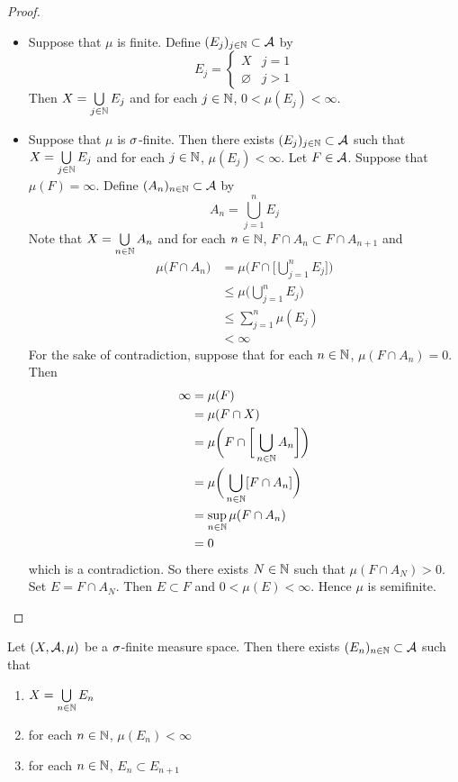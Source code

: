 \documentclass{book}
\begin{document}
	\begin{proof}\
		\begin{itemize}
			\item Suppose that $\mu$ is finite. Define $(E_j)_{j \in \mathbb{N}} \subset \mathcal{A}$ by 
			\[E_j =
			\begin{cases}
				X & j=1 \\
				\varnothing & j > 1
			\end{cases}
			\]
			Then $X = \bigcup\limits_{j \in \mathbb{N}} E_j$ and for each $j \in \mathbb{N}$, $0 < \mu(E_j) < \infty$.
			\item Suppose that $\mu$ is $\sigma$-finite. Then there exists $(E_j)_{j \in \mathbb{N}} \subset \mathcal{A}$ such that $X = \bigcup\limits_{j \in \mathbb{N}} E_j$
			and for each $j \in \mathbb{N}$, $\mu(E_j) < \infty$. Let $F \in \mathcal{A}$. Suppose that $\mu(F) = \infty$. Define $(A_n)_{n \in \mathbb{N}} \subset \mathcal{A}$ by 
			$$A_n = \bigcup_{j=1}^n E_j$$
			Note that $X = \bigcup\limits_{n \in \mathbb{N}} A_n$ and for each $n \in \mathbb{N}$, $F \cap A_n \subset F \cap A_{n+1}$ and 
			\begin{align*}
				\mu \bigg (F \cap A_n \bigg)  
				& = \mu \bigg (F \cap \bigg[ \bigcup_{j=1}^n E_j \bigg] \bigg)  \\
				& \leq \mu \bigg (\bigcup_{j=1}^n E_j \bigg) \\
				& \leq \sum\limits_{j=1}^n \mu(E_j) \\
				& < \infty
			\end{align*}
			For the sake of contradiction, suppose that for each $n \in \mathbb{N}$, $\mu  (F \cap A_n ) = 0$. Then
			\begin{align*}
				\infty 
				& = \mu(F) \\
				& = \mu(F \cap X) \\
				& = \mu\bigg(F \cap \bigg[ \bigcup_{n \in \mathbb{N}} A_n \bigg] \bigg) \\
				& = \mu\bigg(  \bigcup_{n \in \mathbb{N}} [F \cap A_n] \bigg) \\
				& = \sup\limits_{n \in \mathbb{N}} \mu(F \cap A_n) \\
				& = 0
			\end{align*}
			which is a contradiction. So there exists $N \in \mathbb{N}$ such that $\mu  (F \cap A_N ) > 0$. Set $E = F \cap A_N$. Then $E \subset F$ and $0 < \mu(E) < \infty$. Hence $\mu$ is semifinite.
		\end{itemize}
	\end{proof}

	\begin{ex} 
		Let $(X, \mathcal{A}, \mu)$ be a $\sigma$-finite measure space. Then there exists $(E_n)_{n \in \mathbb{N}} \subset \mathcal{A}$ such that 
		\begin{enumerate}
			\item $X = \bigcup\limits_{n \in \mathbb{N}} E_n$
			\item for each $n \in \mathbb{N}$, $\mu(E_n) < \infty$ 
			\item for each $n \in \mathbb{N}$, $E_n \subset E_{n+1}$
		\end{enumerate}
	\end{ex}
\end{document}
